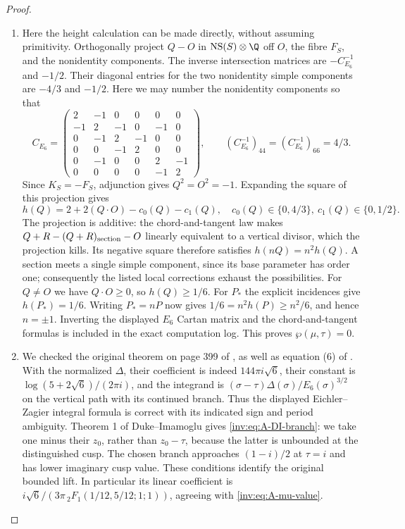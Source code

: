 \begin{proof}
\begin{enumerate}[label=\arabic*.,leftmargin=*]
\item Here the height calculation can be made directly, without assuming
primitivity.  Orthogonally project $Q-O$ in
$\operatorname{NS}(S)\otimes\Q$ off $O$, the fibre $F_S$, and the
nonidentity components.  The inverse intersection matrices are
$-C_{E_6}^{-1}$ and $-1/2$.  Their diagonal entries for the two
nonidentity simple components are $-4/3$ and $-1/2$.
Here we may number the nonidentity components so that
\[
C_{E_6}=\begin{pmatrix}
2&-1&0&0&0&0\\
-1&2&-1&0&-1&0\\
0&-1&2&-1&0&0\\
0&0&-1&2&0&0\\
0&-1&0&0&2&-1\\
0&0&0&0&-1&2
\end{pmatrix},\qquad
(C_{E_6}^{-1})_{44}=(C_{E_6}^{-1})_{66}=4/3.
\]
Since $K_S=-F_S$, adjunction gives $Q^2=O^2=-1$.  Expanding the
square of this projection gives
\[
h(Q)=2+2(Q\cdot O)-c_0(Q)-c_1(Q),\quad
c_0(Q)\in\{0,4/3\},\ c_1(Q)\in\{0,1/2\}.
\]
The projection is additive: the chord-and-tangent law makes
$Q+R-(Q+R)_{\rm section}-O$ linearly equivalent to a vertical
divisor, which the projection kills.  Its negative square therefore
satisfies $h(nQ)=n^2h(Q)$.  A section meets a single simple
component, since its base parameter has order one; consequently
the listed local corrections exhaust the possibilities.
For $Q\ne O$ we have $Q\cdot O\ge0$, so $h(Q)\ge1/6$.
For $P_*$ the explicit incidences give $h(P_*)=1/6$.
Writing $P_*=nP$ now gives $1/6=n^2h(P)\ge n^2/6$, and hence
$n=\pm1$.  Inverting the displayed $E_6$ Cartan matrix and the
chord-and-tangent formulas is included in the exact computation log.
This proves $\wp(\mu,\tau)=0$.

\item We checked the original theorem on page 399 of
\citet{EichlerZagier1982}, as well as equation (6) of
\citet{DukeImamoglu2008}.  With the normalized $\Delta$, their
coefficient is indeed $144\pi i\sqrt6$, their constant is
$\log(5+2\sqrt6)/(2\pi i)$, and the integrand is
$(\sigma-\tau)\Delta(\sigma)/E_6(\sigma)^{3/2}$ on the vertical
path with its continued branch.  Thus the displayed Eichler--Zagier integral formula is
correct with its indicated sign and period ambiguity.  Theorem 1
of Duke--Imamoglu gives \eqref{inv:eq:A-DI-branch}: we take one minus
their $z_0$, rather than $z_0-\tau$, because the latter is unbounded
at the distinguished cusp.  The chosen branch approaches
$(1-i)/2$ at $\tau=i$ and has lower imaginary cusp value.
These conditions identify the original bounded lift.  In particular
its linear coefficient is
$i\sqrt6/(3\pi\,{}_2F_1(1/12,5/12;1;1))$, agreeing with
\eqref{inv:eq:A-mu-value}.


\end{enumerate}
\end{proof}
